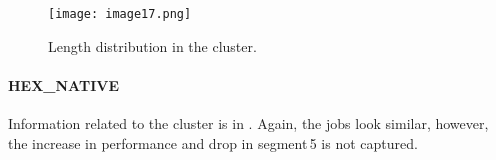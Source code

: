 \documentclass{jhps}
\begin{document}
\begin{minipage}{\textwidth}
\medskip

\begingroup
  \begin{subfigure}{\textwidth}
  \centering
  \texttt{[image: image17.png]}
  \caption{Length distribution in the cluster.}
  \label{fig:use_case:hex_lev:length}
  \end{subfigure}
\endgroup

\label{fig:use_case:hex_lev}
\end{minipage}


\paragraph{HEX\_NATIVE}
Information related to the cluster is in .
Again, the jobs look similar, however, the increase in performance and drop in segment\,5 is not captured.
\end{document}
